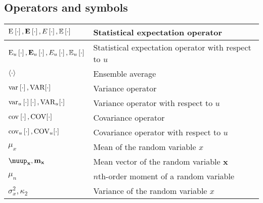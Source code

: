 \documentclass{article}
\begin{document}
\subsection{Operators and symbols}
\begin{xltabular}{\textwidth}{XX}
    \(\E{\cdot}, \nossekE{\cdot}, E\left[ \cdot \right], \mathbb{E}\left[ \cdot \right]\)               & Statistical expectation operator \cite{nossekAdaptiveArraySignal2015,dinizAdaptiveFilteringAlgorithms2002}\\ \hline
    \(\E[u]{\cdot}, \nossekE[u]{\cdot},  E_u\left[ \cdot \right], \mathbb{E}_u\left[ \cdot \right]\)    & Statistical expectation operator with respect to \(u\)\\ \hline
    \(\expval{\cdot}\)                                                                                  & Ensemble average\\ \hline
    \(\var{\cdot}, \textnormal{VAR}[\cdot]\)                                                            & Variance operator \cite{haykinAdaptiveFilterTheory2002,leon-garciaProbabilityStatisticsRandom2007,proakisDigitalCommunications2007,bishopPatternRecognitionMachine2006}\\ \hline
    \(\var[u]{\cdot} \left[ \cdot \right], \textnormal{VAR}_u[\cdot]\)                                  & Variance operator with respect to \(u\)\\ \hline
    \(\cov{\cdot}, \textnormal{COV}[\cdot]\)                                                            & Covariance operator \cite{bishopPatternRecognitionMachine2006}\\ \hline
    \(\cov[u]{\cdot}, \textnormal{COV}_u[\cdot]\)                                                       & Covariance operator with respect to \(u\)\\ \hline
    \(\mu_x\)                                                                                           & Mean of the random variable \(x\) \\ \hline
    \(\boldsymbol{\muup}_\mathbf{x}, \mathbf{m}_\mathbf{x}\)                                            & Mean vector of the random variable \(\mathbf{x}\) \cite{brownIntroductionRandomSignals1997} \\ \hline
    \(\mu_n\)                                                                                           & \(n\)th-order moment of a random variable \\ \hline
    \(\sigma_x^2, \kappa_2\)                                                                            & Variance of the random variable \(x\)\\ \hline

\end{xltabular}
\end{document}
